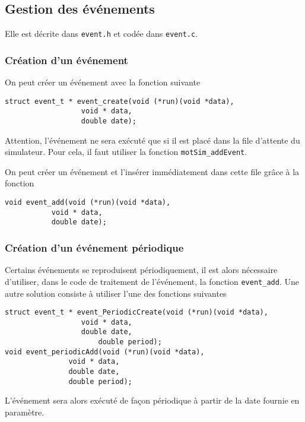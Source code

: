 %
\subsection{Gestion des événements}

   Elle est décrite dans {\tt event.h} et codée dans {\tt event.c}.

%
\subsubsection{Création d'un événement}
 
   On peut créer un événement avec la fonction suivante 

\begin{verbatim}
struct event_t * event_create(void (*run)(void *data),
			      void * data,
			      double date);
\end{verbatim}

   Attention, l'événement ne sera exécuté que si il est placé dans la
file d'attente du simulateur. Pour cela, il faut utiliser la fonction
{\tt motSim\_addEvent}. 

   On peut créer un événement et l'insérer immédiatement dans cette
file grâce à la fonction

\begin{verbatim}
void event_add(void (*run)(void *data),
	       void * data,
	       double date);
\end{verbatim}

%
\subsubsection{Création d'un événement périodique}

   Certains événements se reproduisent périodiquement, il est alors
nécessaire d'utiliser, dans le code de traitement de l'événement, la
fonction {\tt event\_add}. Une autre solution consiste à utiliser
l'une des fonctions suivantes 

\begin{verbatim}
struct event_t * event_PeriodicCreate(void (*run)(void *data),
			      void * data,
			      double date,
		              double period);
void event_periodicAdd(void (*run)(void *data),
		       void * data,
		       double date,
		       double period);

\end{verbatim}

   L'événement sera alors exécuté de façon périodique à partir de la
date fournie en paramètre.



